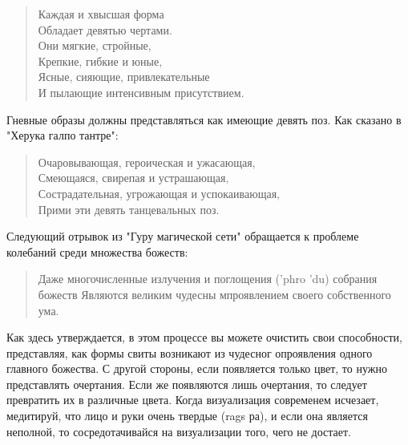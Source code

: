 \begin{verse}
Каждая и хвысшая форма\\
Обладает девятью чертами.\\
Они мягкие, стройные,\\
Крепкие, гибкие и юные,\\
Ясные, сияющие, привлекательные\\
И пылающие интенсивным присутствием.
\end{verse}

Гневные образы должны представляться как имеющие девять поз. Как сказано в "Херука галпо тантре":

\begin{verse}
Очаровывающая, героическая и ужасающая,\\
Смеющаяся, свирепая и устрашающая,\\
Сострадательная, угрожающая и успокаивающая,\\
Прими эти девять танцевальных поз.
\end{verse}

Следующий отрывок из "Гуру магической сети" обращается к проблеме колебаний среди множества божеств:

\begin{verse}
Даже многочисленные излучения и поглощения ('phro 'du) собрания божеств
Являются великим чудесны мпроявлением своего собственного ума.
\end{verse}

Как здесь утверждается, в этом процессе вы можете очистить свои способности,
представляя, как формы свиты возникают из чудесног опроявления одного главного
божества. С другой стороны, если появляется только цвет, то нужно представлять очертания.
Если же появляются лишь очертания, то следует превратить их в различные цвета. Когда
визуализация современем исчезает, медитируй, что лицо и руки очень твердые (rags ра), и
если она является неполной, то сосредотачивайся на визуализации того, чего не достает.

